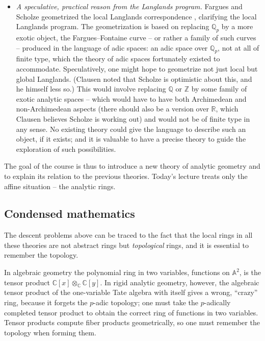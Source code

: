 \begin{itemize}
\item \emph{A speculative, practical reason from the Langlands program.} Fargues
and Scholze geometrized the local Langlands correspondence
\cite{fargues2024geometrizationlocallanglandscorrespondence}, clarifying the
local Langlands program. The geometrization is based on replacing $\mathbb{Q}_p$
by a more exotic object, the Fargues--Fontaine curve -- or rather a family of
such curves -- produced in the language of adic spaces: an adic space over
$\mathbb{Q}_p$, not at all of finite type, which the theory of adic spaces
fortunately existed to accommodate. Speculatively, one might hope to geometrize
not just local but global Langlands. (Clausen noted that Scholze is optimistic
about this, and he himself less so.) This would involve replacing $\mathbb{Q}$
or $\mathbb{Z}$ by some family of exotic analytic spaces -- which would have to
have both Archimedean and non-Archimedean aspects (there should also be a version
over $\mathbb{R}$, which Clausen believes Scholze is working out) and would not
be of finite type in any sense. No existing theory could give the language to
describe such an object, if it exists; and it is valuable to have a precise
theory to guide the exploration of such possibilities.
\end{itemize}

The goal of the course is thus to introduce a new theory of analytic geometry and
to explain its relation to the previous theories. Today's lecture treats only the
affine situation -- the analytic rings.

\subsection{Condensed mathematics}

The descent problems above can be traced to the fact that the local rings in all
these theories are not abstract rings but \emph{topological} rings, and it is
essential to remember the topology.

\begin{example}
\label{ex:1:completed-tensor}
In algebraic geometry the polynomial ring in two variables, functions on
$\mathbb{A}^2$, is the tensor product $\mathbb{C}[x]\otimes_{\mathbb{C}}\mathbb{C}[y]$.
In rigid analytic geometry, however, the algebraic tensor product of the
one-variable Tate algebra with itself gives a wrong, ``crazy'' ring, because it
forgets the $p$-adic topology; one must take the $p$-adically completed tensor
product to obtain the correct ring of functions in two variables. Tensor products
compute fiber products geometrically, so one must remember the topology when
forming them.
\end{example}

